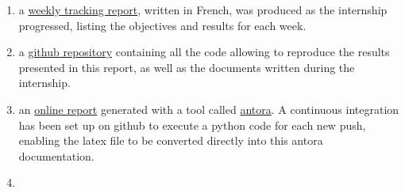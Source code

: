 \begin{enumerate}[label=\textbullet]
	\item a \href{https://github.com/flecourtier/phifem_stage/blob/main/docs/suivi/suivi.pdf}{weekly tracking report}, written in French, was produced as the internship progressed, listing the objectives and results for each week.
	\item a \href{https://github.com/flecourtier/phifem_stage}{github repository} containing all the code allowing to reproduce the results presented in this report, as well as the documents written during the internship. 
	\item an \href{https://flecourtier.github.io/phifem_stage/phifem_project/1.0.3/main_page.html}{online report} generated with a tool called \href{https://antora.org/}{antora}. A continuous integration has been set up on github to execute a python code for each new push, enabling the latex file to be converted directly into this antora documentation.
	\item {} %
\end{enumerate}